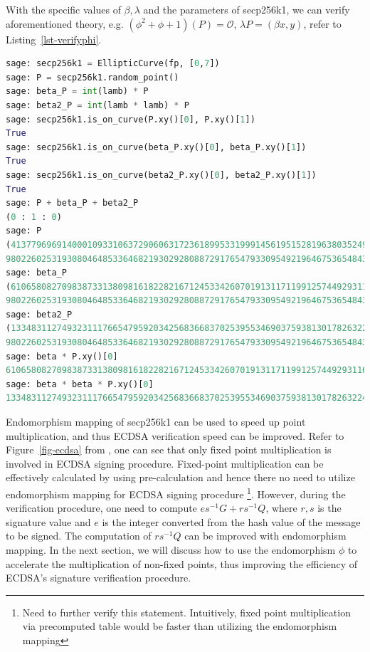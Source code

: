 \documentclass{article}
\begin{document}
With the specific values of $\beta, \lambda$ and the parameters of secp256k1, we can verify aforementioned theory, 
e.g. $(\phi^2+\phi + 1)(P) = \mathcal{O}$,  $\lambda P = (\beta x, y)$, refer to Listing~\ref{lst-verifyphi}.

\begin{lstlisting}[language=python, caption=\texttt{verify endomorphism $\phi$ with $\beta, \lambda$ for secp256k1}, label=lst-verifyphi]
sage: secp256k1 = EllipticCurve(fp, [0,7])
sage: P = secp256k1.random_point()
sage: beta_P = int(lamb) * P
sage: beta2_P = int(lamb * lamb) * P
sage: secp256k1.is_on_curve(P.xy()[0], P.xy()[1])
True
sage: secp256k1.is_on_curve(beta_P.xy()[0], beta_P.xy()[1])
True
sage: secp256k1.is_on_curve(beta2_P.xy()[0], beta2_P.xy()[1])
True
sage: P + beta_P + beta2_P
(0 : 1 : 0)
sage: P
(41377969691400010933106372906063172361899533199914561951528196380352494104025 : 
98022602531930804648533646821930292808872917654793309549219646753654843391634 : 1)
sage: beta_P
(61065808270983873313809816182282167124533426070191311711991257449293116444501 : 
98022602531930804648533646821930292808872917654793309549219646753654843391634 : 1)
sage: beta2_P
(13348311274932311176654795920342568366837025395534690375938130178263224123137 : 
98022602531930804648533646821930292808872917654793309549219646753654843391634 : 1)
sage: beta * P.xy()[0]
61065808270983873313809816182282167124533426070191311711991257449293116444501
sage: beta * beta * P.xy()[0]
13348311274932311176654795920342568366837025395534690375938130178263224123137
\end{lstlisting}

Endomorphism mapping of secp256k1 can be used to speed up point multiplication, and thus ECDSA verification speed can be improved.
Refer to Figure~\ref{fig-ecdsa} from \cite{stallings}, one can see  that 
only fixed point multiplication is involved in ECDSA signing procedure.
Fixed-point multiplication can be effectively calculated by using pre-calculation and 
hence there no need to utilize endomorphism mapping for ECDSA signing procedure
\footnote{Need to further verify this statement. Intuitively, fixed point multiplication via precomputed table 
would be faster than utilizing the endomorphism mapping}.
However, during the verification procedure, one need to compute $es^{-1}G+rs^{-1}Q$, 
where $r,s$ is the signature value and $e$ is the integer converted from the hash value of the message to be signed.
The computation of $rs^{-1}Q$ can be improved with endomorphism mapping.
In the next section, we will discuss how to use the endomorphism $\phi$ to accelerate the multiplication of non-fixed points, 
thus improving the efficiency of ECDSA’s signature verification procedure. 
\end{document}
